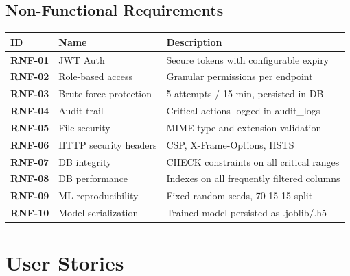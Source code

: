 \documentclass[12pt,a4paper]{article}
\begin{document}
\subsection{Non-Functional Requirements}
\begin{longtable}{>{\bfseries}p{2.5cm} p{4cm} p{6cm}}
  \toprule
  \textbf{ID} & \textbf{Name} & \textbf{Description} \\
  \midrule
  RNF-01 & JWT Auth & Secure tokens with configurable expiry \\
  RNF-02 & Role-based access & Granular permissions per endpoint \\
  RNF-03 & Brute-force protection & 5 attempts / 15 min, persisted in DB \\
  RNF-04 & Audit trail & Critical actions logged in audit\_logs \\
  RNF-05 & File security & MIME type and extension validation \\
  RNF-06 & HTTP security headers & CSP, X-Frame-Options, HSTS \\
  RNF-07 & DB integrity & CHECK constraints on all critical ranges \\
  RNF-08 & DB performance & Indexes on all frequently filtered columns \\
  RNF-09 & ML reproducibility & Fixed random seeds, 70-15-15 split \\
  RNF-10 & Model serialization & Trained model persisted as .joblib/.h5 \\
  \bottomrule
\end{longtable}

\section{User Stories}
\end{document}
